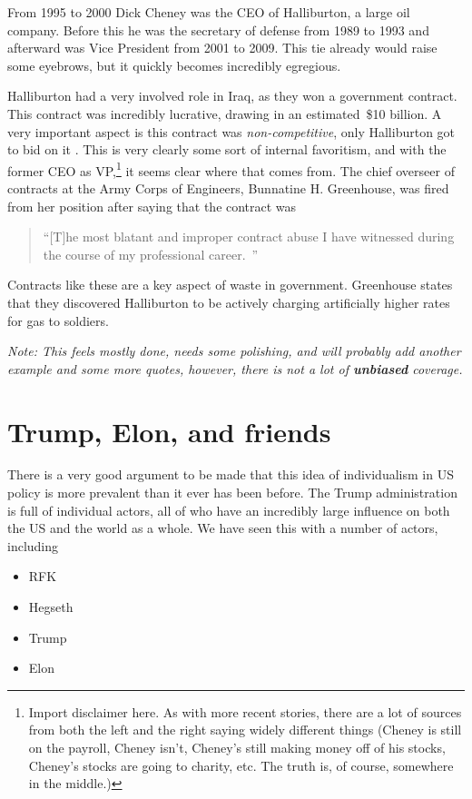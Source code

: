 \documentclass{article}
\begin{document}
        From 1995 to 2000 Dick Cheney was the CEO of Halliburton, a large oil company. Before this he was the secretary of defense from 1989 to 1993 and afterward was Vice President from 2001 to 2009. This tie already would raise some eyebrows, but it quickly becomes incredibly egregious. 
        
        Halliburton had a very involved role in Iraq, as they won a government contract. This contract was incredibly lucrative, drawing in an estimated~\$10 billion. A very important aspect is this contract was \textit{non-competitive}, only Halliburton got to bid on it \parencite{bbc2008iraqcontracts}. This is very clearly some sort of internal favoritism, and with the former CEO as VP,\footnote{Import disclaimer here. As with more recent stories, there are a lot of sources from both the left and the right saying widely different things (Cheney is still on the payroll, Cheney 
        isn't, Cheney's still making money off of his stocks, Cheney's stocks are going to charity, etc. The truth is, of course, somewhere in the middle.)}
        it seems clear where that comes from. The chief overseer of contracts at the Army Corps of Engineers, Bunnatine H. Greenhouse, was fired from her position after saying that the contract was 

        \begin{quote}
            ``[T]he most blatant and improper contract abuse I have witnessed during the course of my professional career.~\parencite{nytimes2005halliburtoncontract}''
        \end{quote}  
        
        Contracts like these are a key aspect of waste in government. Greenhouse states that they discovered Halliburton to be actively charging artificially higher rates for gas to soldiers.~\parencite{nytimes2005halliburtoncontract} 

        \textit{Note: This feels mostly done, needs some polishing, and will probably add another example and some more quotes, however, there is not a lot of \textbf{unbiased} coverage. }
        
        

\section{Trump, Elon, and friends}
    There is a very good argument to be made that this idea of individualism in US policy is more prevalent than it ever has been before. The Trump administration is full of individual actors, all of who have an incredibly large influence on both the US and the world as a whole. We have seen this with a number of actors, including 
    \begin{itemize}
        \item RFK
        \item Hegseth 
        \item Trump
        \item Elon
    \end{itemize}
\end{document}

